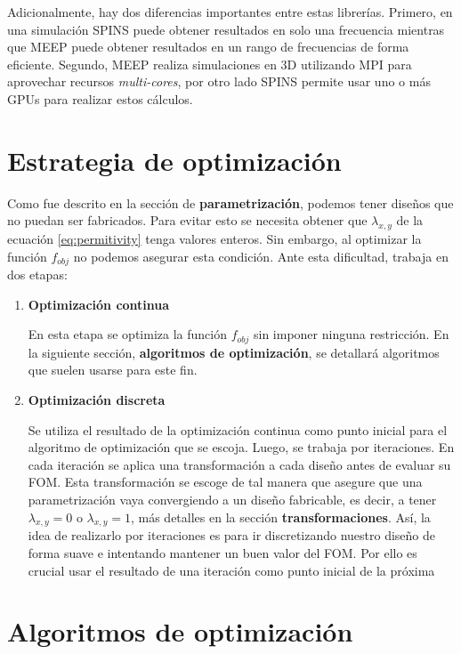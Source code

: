 Adicionalmente, hay dos diferencias importantes entre estas librerías.
Primero, en una simulación SPINS puede obtener resultados en solo una
frecuencia mientras que MEEP puede obtener resultados en un rango de
frecuencias de forma eficiente.
Segundo, MEEP realiza simulaciones en 3D utilizando MPI para aprovechar
recursos \emph{multi-cores}, por otro lado SPINS permite usar uno o más GPUs
para realizar estos cálculos.

\section{Estrategia de optimización}

Como fue descrito en la sección de \textbf{parametrización}, podemos
tener diseños que no puedan ser fabricados.
Para evitar esto se necesita obtener que $\lambda_{x, y}$ de la ecuación \ref{eq:permitivity} tenga valores enteros.
Sin embargo, al optimizar la función $f_{obj}$ no podemos asegurar esta condición.
Ante esta dificultad, \cite{Su2020} trabaja en dos etapas:


\begin{enumerate}

\item{\textbf{Optimización continua}}

En esta etapa se optimiza la función $f_{obj}$ sin imponer ninguna restricción.
En la siguiente sección, \textbf{algoritmos de optimización}, se detallará algoritmos que suelen usarse para este fin.

\item{\textbf{Optimización discreta}}

Se utiliza el resultado de la optimización continua como punto inicial para el algoritmo de optimización que se escoja.
Luego, se trabaja por iteraciones.
En cada iteración se aplica una transformación a cada diseño antes de evaluar su FOM.
Esta transformación se escoge de tal manera que asegure que una
parametrización vaya convergiendo a un diseño fabricable, es decir,
a tener $\lambda_{x, y} = 0$ o $\lambda_{x, y} = 1$, más detalles en la sección \textbf{transformaciones}.
Así, la idea de realizarlo por iteraciones es para ir discretizando nuestro diseño
de forma suave e intentando mantener un buen valor del FOM.
Por ello es crucial usar el resultado de una iteración como punto inicial de la próxima

\end{enumerate}

\section{Algoritmos de optimización}

